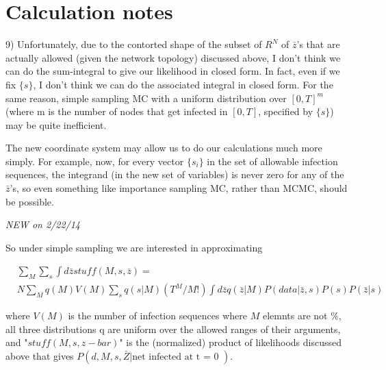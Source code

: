 \documentclass{article}
\begin{document}
\section{Calculation notes}

        9) Unfortunately, due to the contorted shape of the subset of
        $R^N$ of $\bar{z}$'s that are actually allowed (given the network topology)
        discussed above, I don't think we can do the sum-integral to give our
        likelihood in closed form. In fact, even if we fix $\{s\}$, I don't
        think we can do the associated integral in closed form. For the same
        reason, simple sampling MC with a uniform distribution over $[0, T]^m$
        (where m is the number of nodes that get infected in $[0, T]$, specified
        by $\{s\}$) may be quite inefficient.


        The new coordinate system may allow us to do our calculations much more simply. For
        example, now, for every vector $\{s_i\}$ in the set of allowable infection sequences, the 
        integrand (in the new set of variables) is never zero for any of the
        $\bar{z}$'s,  so even something like importance sampling MC, rather than 
        MCMC, should be possible. 

        \emph{NEW on 2/22/14}

        So under simple sampling we are interested in approximating

\begin{align}
& \sum_{M}  \sum_{s} \int d\bar{z} stuff(M, s, \bar{z}) =\\
& N \sum_M q(M)  V(M) \sum_{s} q(s | M)   (T^M/M!)  \int d\bar{z} q(\bar{z} | M) P(data | \bar{z},s)P(s)P(\bar{z} |s) 
\label{draw}
\end{align}

        where $V(M)$ is the number of infection sequences where  $M$ elemnts are not \%, 
        all three distributions q are uniform over the allowed ranges of their arguments, and 
        "$stuff(M, s, z-bar)$" is the
        (normalized) product of likelihoods discussed above that gives
        $P(d, M, s, \bar{Z} | \text{net infected at t  = 0 })$.
\end{document}
